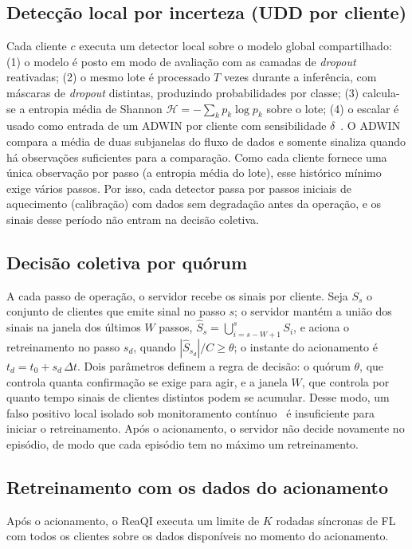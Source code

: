\documentclass[conference]{IEEEtran}
\begin{document}
\subsection{Detecção local por incerteza (UDD por cliente)} Cada cliente $c$ executa um detector local sobre o modelo global compartilhado: (1) o modelo é posto em modo de avaliação com as camadas de \textit{dropout} reativadas; (2) o mesmo lote é processado $T$ vezes durante a inferência, com máscaras de \textit{dropout} distintas, produzindo probabilidades por classe; (3) calcula-se a entropia média de Shannon $\mathcal{H}=-\sum_k p_k\log p_k$ sobre o lote; (4) o escalar é usado como entrada de um ADWIN por cliente com sensibilidade $\delta$~\cite{bifet2007,baier2023}. O ADWIN compara a média de duas subjanelas do fluxo de dados e somente sinaliza quando há observações suficientes para a comparação. Como cada cliente fornece uma única observação por passo (a entropia média do lote), esse histórico mínimo exige vários passos. Por isso, cada detector passa por passos iniciais de aquecimento (calibração) com dados sem degradação antes da operação, e os sinais desse período não entram na decisão coletiva.

\subsection{Decisão coletiva por quórum} A cada passo de operação, o servidor recebe os sinais por cliente. Seja $S_s$ o conjunto de clientes que emite sinal no passo $s$; o servidor mantém a união dos sinais na janela dos últimos $W$ passos, $\hat{S}_s = \bigcup_{i=s-W+1}^{s} S_i$, e aciona o retreinamento no passo $s_d$, quando $|\hat{S}_{s_d}|/C \ge \theta$; o instante do acionamento é $t_d=t_0+s_d\,\Delta t$. Dois parâmetros definem a regra de decisão: o quórum $\theta$, que controla quanta confirmação se exige para agir, e a janela $W$, que controla por quanto tempo sinais de clientes distintos podem se acumular. Desse modo, um falso positivo local isolado sob monitoramento contínuo~\cite{poenaru2022} é insuficiente para iniciar o retreinamento. Após o acionamento, o servidor não decide novamente no episódio, de modo que cada episódio tem no máximo um retreinamento.

\subsection{Retreinamento com os dados do acionamento} Após o acionamento, o ReaQI executa um limite de $K$ rodadas síncronas de FL com todos os clientes sobre os dados disponíveis no momento do acionamento.
\end{document}
